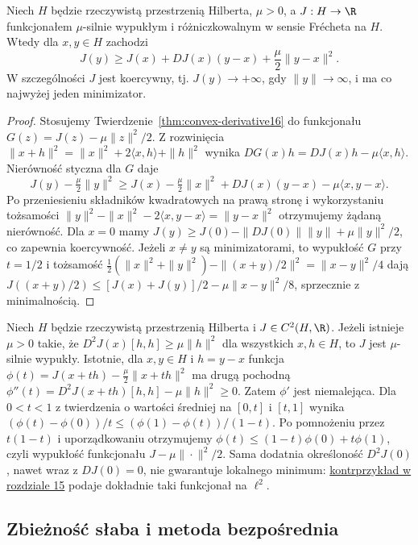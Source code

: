 \begin{stwierdzenie}
\label{prop:strong-coercive16}
Niech $H$ będzie rzeczywistą przestrzenią Hilberta,
$\mu>0$, a $J:H\to\R$ funkcjonałem $\mu$-silnie wypukłym
i różniczkowalnym w sensie Frécheta na $H$. Wtedy dla $x,y\in H$
zachodzi
\[
J(y)\ge J(x)+DJ(x)(y-x)+\frac\mu2\|y-x\|^2.
\]
W szczególności $J$ jest koercywny, tj.
$J(y)\to+\infty$, gdy $\|y\|\to\infty$,
i ma co najwyżej jeden minimizator.
\end{stwierdzenie}
\begin{proof}
Stosujemy Twierdzenie~\ref{thm:convex-derivative16}
do funkcjonału $G(z)=J(z)-\mu\|z\|^2/2$.
Z rozwinięcia
$\|x+h\|^2=\|x\|^2+2\langle x,h\rangle+\|h\|^2$
wynika $DG(x)h=DJ(x)h-\mu\langle x,h\rangle$.
Nierówność styczna dla $G$ daje
\[
 J(y)-\tfrac\mu2\|y\|^2
 \ge J(x)-\tfrac\mu2\|x\|^2
       +DJ(x)(y-x)-\mu\langle x,y-x\rangle .
\]
Po przeniesieniu składników kwadratowych na prawą stronę
i wykorzystaniu tożsamości
$\|y\|^2-\|x\|^2-2\langle x,y-x\rangle=\|y-x\|^2$
otrzymujemy żądaną nierówność.
Dla $x=0$ mamy
$J(y)\ge J(0)-\|DJ(0)\|\|y\|+\mu\|y\|^2/2$,
co zapewnia koercywność. Jeżeli $x\ne y$ są minimizatorami,
to wypukłość $G$ przy $t=1/2$ i tożsamość
$\tfrac12(\|x\|^2+\|y\|^2)-\|(x+y)/2\|^2
=\|x-y\|^2/4$ dają
$J((x+y)/2)\le [J(x)+J(y)]/2-\mu\|x-y\|^2/8$,
sprzecznie z minimalnością.
\end{proof}

\begin{przyklad}
\label{ex:variational-hessian16}
Niech $H$ będzie rzeczywistą przestrzenią Hilberta
i $J\in C^2(H,\R)$. Jeżeli istnieje $\mu>0$ takie, że
$D^2J(x)[h,h]\ge\mu\|h\|^2$ dla wszystkich $x,h\in H$,
to $J$ jest $\mu$-silnie wypukły.
Istotnie, dla $x,y\in H$ i $h=y-x$ funkcja
$\phi(t)=J(x+th)-\frac\mu2\|x+th\|^2$
ma drugą pochodną
$\phi''(t)=D^2J(x+th)[h,h]-\mu\|h\|^2\ge0$.
Zatem $\phi'$ jest niemalejąca. Dla $0<t<1$
z twierdzenia o wartości średniej na $[0,t]$ i $[t,1]$
wynika
$(\phi(t)-\phi(0))/t\le(\phi(1)-\phi(t))/(1-t)$.
Po pomnożeniu przez $t(1-t)$ i uporządkowaniu
otrzymujemy $\phi(t)\le(1-t)\phi(0)+t\phi(1)$,
czyli wypukłość funkcjonału $J-\mu\|\cdot\|^2/2$.
Sama dodatnia określoność $D^2J(0)$, nawet wraz
z $DJ(0)=0$, nie gwarantuje lokalnego minimum:
\hyperref[ex:positive-hessian15]{kontrprzykład w rozdziale 15}
podaje dokładnie taki funkcjonał na $\ell^2$.
\end{przyklad}

\subsection{Zbieżność słaba i metoda bezpośrednia}

